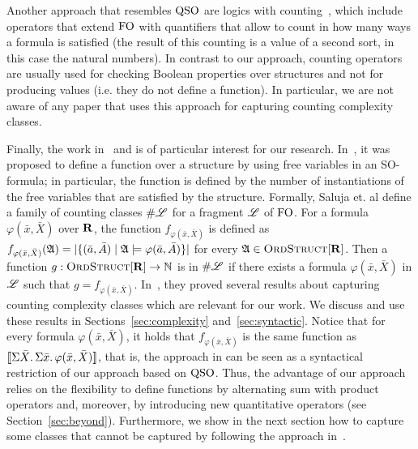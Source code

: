 Another approach that resembles ${\rm QSO}$ are logics with counting~\cite{IL90,E97,GG98,L04}, which include operators that extend ${\rm FO}$ with quantifiers that allow to count in how many ways a formula  is satisfied (the result of this counting is a value of a second sort, in this case the  natural numbers). 
In contrast to our approach, counting operators are usually used for checking Boolean properties over structures and not for producing values (i.e. they do not define a function).
In particular, we are not aware of any paper that uses this approach for capturing counting complexity classes.

Finally, the work in~\cite{SalujaST95} and \cite{ComptonG96} is of particular interest for our research. 
In~\cite{SalujaST95}, it was proposed to define a function over a structure by using free variables in an SO-formula; in particular, the function is defined by the number of instantiations of the free variables that are satisfied by the structure.
Formally, Saluja et. al \cite{SalujaST95} define a family of counting classes $\#\mathscr{L}$ for a fragment $\mathscr{L}$ of ${\rm FO}$. For a formula $\varphi(\bar{x},\bar{X})$ over $\mathbf{R}$, the function $f_{\varphi(\bar x, \bar X)}$ is defined as
$
f_{\varphi(\bar x, \bar X)}(\mathfrak{A}) = \vert \{(\bar{a},\bar{A}) \mid \mathfrak{A}\models\varphi(\bar{a},\bar{A})\}\vert
$
for every $\mathfrak{A}\in\text{\sc OrdStruct}[\mathbf{R}]$. Then a function $g:\text{\sc OrdStruct}[\mathbf{R}]\to\mathbb{N}$ is in $\#\mathscr{L}$ if there exists a formula $\varphi(\bar{x},\bar{X})$ in $\mathscr{L}$ such that $g = f_{\varphi(\bar x, \bar X)}$.
In~\cite{SalujaST95}, they proved several results about capturing counting complexity classes which are relevant for our work. We discuss and use these results in Sections~\ref{sec:complexity} and~\ref{sec:syntactic}.
Notice that for every formula $\varphi(\bar{x},\bar{X})$, it holds that $f_{\varphi(\bar{x},\bar{X})}$ is the same function as ${\llbracket{}{\Sigma{\bar{X}}.\, \Sigma{\bar{x}}.\, \varphi(\bar{x},\bar{X})}\rrbracket}$, that is, the approach in \cite{SalujaST95} can be seen as a syntactical restriction of our approach based on ${\rm QSO}$. 
Thus, the advantage of our approach relies on the flexibility to define functions by alternating sum with product operators and, moreover, by introducing new quantitative operators (see Section~\ref{sec:beyond}).
Furthermore, we show in the next section how to capture some classes that cannot be captured by following the approach in~\cite{SalujaST95}.